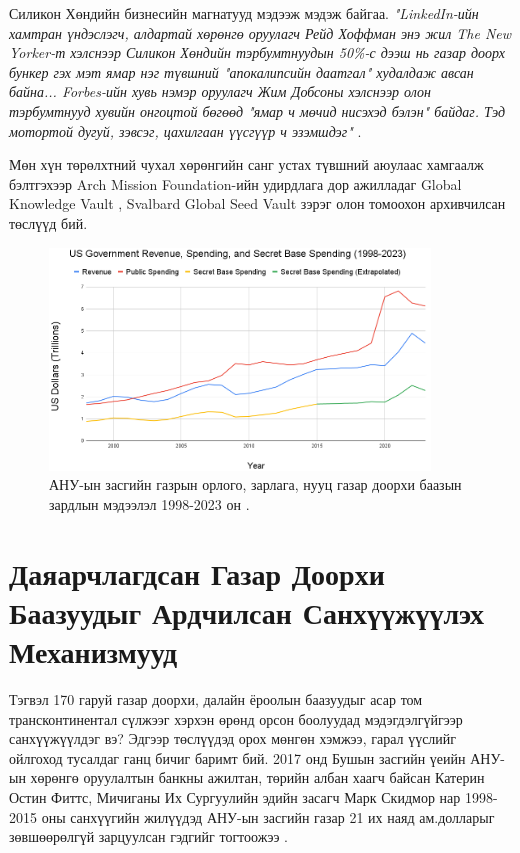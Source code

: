\documentclass[10pt,twocolumn,letterpaper]{article}
\begin{document}
Силикон Хөндийн бизнесийн магнатууд мэдээж мэдэж байгаа. \textit{"LinkedIn-ийн хамтран үндэслэгч, алдартай хөрөнгө оруулагч Рейд Хоффман энэ жил The New Yorker-т хэлснээр Силикон Хөндийн тэрбумтнуудын 50\%-с дээш нь газар доорх бункер гэх мэт ямар нэг түвшний "апокалипсийн даатгал" худалдаж авсан байна... Forbes-ийн хувь нэмэр оруулагч Жим Добсоны хэлснээр олон тэрбумтнууд хувийн онгоцтой бөгөөд "ямар ч мөчид нисэхэд бэлэн" байдаг. Тэд мотортой дугуй, зэвсэг, цахилгаан үүсгүүр ч эзэмшдэг"} \cite{28}.

Мөн хүн төрөлхтний чухал хөрөнгийн санг устах түвшний аюулаас хамгаалж бэлтгэхээр Arch Mission Foundation-ийн удирдлага дор ажилладаг Global Knowledge Vault \cite{29}, Svalbard Global Seed Vault \cite{30} зэрэг олон томоохон архивчилсан төслүүд бий.
\begin{figure}[t]
\begin{center}
\includegraphics[width=0.9\textwidth]{govcrop2.png}
\end{center}
   \caption{АНУ-ын засгийн газрын орлого, зарлага, нууц газар доорхи баазын зардлын мэдээлэл 1998-2023 он \cite{19}.}
   \label{fig:9}
\end{figure}
\section{Даяарчлагдсан Газар Доорхи Баазуудыг Ардчилсан Санхүүжүүлэх Механизмууд}

Тэгвэл 170 гаруй газар доорхи, далайн ёроолын баазуудыг асар том трансконтинентал сүлжээг хэрхэн өрөнд орсон боолуудад мэдэгдэлгүйгээр санхүүжүүлдэг вэ? Эдгээр төслүүдэд орох мөнгөн хэмжээ, гарал үүслийг ойлгоход тусалдаг ганц бичиг баримт бий. 2017 онд Бушын засгийн үеийн АНУ-ын хөрөнгө оруулалтын банкны ажилтан, төрийн албан хаагч байсан Катерин Остин Фиттс, Мичиганы Их Сургуулийн эдийн засагч Марк Скидмор нар 1998-2015 оны санхүүгийн жилүүдэд АНУ-ын засгийн газар 21 их наяд ам.долларыг зөвшөөрөлгүй зарцуулсан гэдгийг тогтоожээ \cite{11,12,13}.
\end{document}
